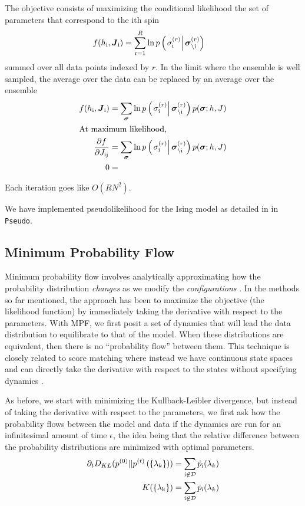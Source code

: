 \documentclass[aps,prl,twocolumn]{revtex4-1}
\begin{document}
The objective consists of maximizing the conditional likelihood the set of parameters that correspond to the ith spin
\begin{align}
	f(h_{\rm i},\boldsymbol{J}_{\rm i}) &= \sum_{\rm r=1}^R \ln p\left(\left.\sigma_{\rm i}^{(r)}\right|\boldsymbol{\sigma}_{\backslash\rm i}^{(r)}\right)
\end{align}
summed over all data points indexed by $r$.
In the limit where the ensemble is well sampled, the average over the data can be replaced by an average over the ensemble
\begin{align}
	f(h_{\rm i},\boldsymbol{J}_{\rm i}) &= \sum_{\boldsymbol{\sigma}} \ln p\left(\left.\sigma_{\rm i}^{(r)}\right|\boldsymbol{\sigma}_{\backslash\rm i}^{(r)}\right)p(\boldsymbol{\sigma};h,J)\\
\intertext{At maximum likelihood,}
	\frac{\partial f}{\partial J_{\rm ij}} &= \sum_{\boldsymbol{\sigma}} \ln p\left(\left.\sigma_{\rm i}^{(r)}\right|\boldsymbol{\sigma}_{\backslash\rm i}^{(r)}\right)p(\boldsymbol{\sigma};h,J)\\
	0 &=
\end{align}

Each iteration goes like $O(RN^2)$.

We have implemented pseudolikelihood for the Ising model as detailed in \cite{Aurell:2012hi} in {\tt Pseudo}.

\subsection{Minimum Probability Flow}
Minimum probability flow involves analytically approximating how the probability distribution \textit{changes} as we modify the \textit{configurations} \cite{SohlDickstein:2011im}. In the methods so far mentioned, the approach has been to maximize the objective (the likelihood function) by immediately taking the derivative with respect to the parameters. With MPF, we first posit a set of dynamics that will lead the data distribution to equilibrate to that of the model. When these distributions are equivalent, then there is no ``probability flow'' between them. This technique is closely related to score matching where instead we have continuous state spaces and can directly take the derivative with respect to the states without specifying dynamics \cite{Hyvarinen:2007ed}.

As before, we start with minimizing the Kullback-Leibler divergence, but instead of taking the derivative with respect to the parameters, we first ask how the probability flows between the model and data if the dynamics are run for an infinitesimal amount of time $\epsilon$, the idea being that the relative difference between the probability distributions are minimized with optimal parameters.
\begin{align}
	\partial_t D_{KL}(p^{(0)}||p^{(t)}\left(\{\lambda_k\}\right)) &= \sum_{\rm i \not\in \mathcal{D}} \dot{p}_{\rm i}(\lambda_k)\\
	K(\{\lambda_{\rm k}\}) &= \sum_{\rm i \not\in \mathcal{D}} \dot{p}_{\rm i}(\lambda_k)
\end{align}
\end{document}
